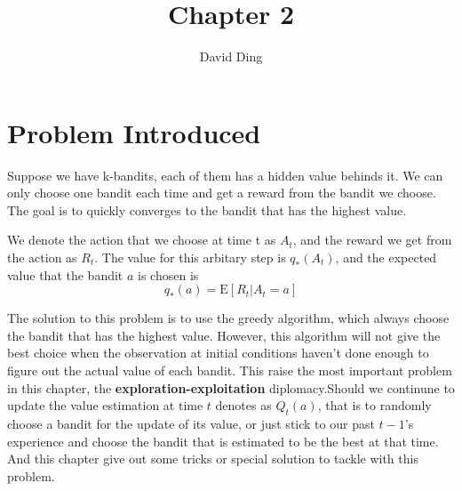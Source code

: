 \documentclass{article}
\title{Chapter 2}
\author{David Ding}
\begin{document}
\maketitle

\section{Problem Introduced}

Suppose we have k-bandits, each of them has a hidden value behinds it. We can only choose one bandit each time 
and get a reward from the bandit we choose. The goal is to quickly converges to the bandit that has the highest value.

We denote the action that we choose at time t as $A_t$, and the reward we get from the action as $R_t$. 
The value for this arbitary step is $q_*(A_t)$, and the expected value that the bandit $a$ is chosen is
$$q_*(a) = \mathrm{E}[R_t|A_t=a]$$

The solution to this problem is to use the greedy algorithm, which always choose the bandit that has the highest value. 
However, this algorithm will not give the best choice when the observation at initial conditions haven't done enough to 
figure out the actual value of each bandit. 
This raise the most important problem in this chapter, the \textbf{exploration-exploitation} diplomacy.Should we continune to 
update the value estimation at time $t$ denotes as $Q_t(a)$, that is to randomly choose a bandit for the update 
of its value, or just stick to our past $t-1$'s experience and choose the bandit that is estimated to be the best at that time.
And this chapter give out some tricks or special solution to tackle with this problem.
\end{document}
